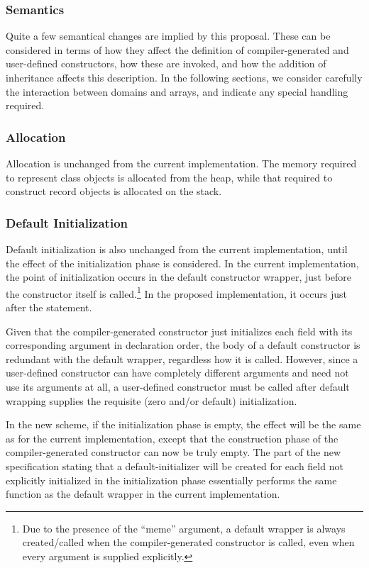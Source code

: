\subsubsection{Semantics}

Quite a few semantical changes are implied by this proposal.  These can be
considered in terms of how they affect the definition of compiler-generated and
user-defined constructors, how these are invoked, and how the addition of
inheritance affects this description.  In the following sections, we consider carefully the interaction
between domains and arrays, and indicate any special handling required.

\subsubsection{Allocation}

Allocation is unchanged from the current implementation.  The memory
required to represent class objects is allocated from the heap, while that
required to construct record objects is allocated on the stack.  

\subsubsection{Default Initialization} 
Default initialization is also unchanged from the current
implementation, until the effect of the initialization phase is considered.  In
the current implementation, the point of initialization occurs in the default
constructor wrapper, just before the constructor itself is called.\footnote{Due
to the presence of the ``meme'' argument, a default wrapper is always
created/called when the compiler-generated constructor is called, even when
every argument is supplied explicitly.}  In the proposed implementation, it
occurs just after the  statement.

Given that the compiler-generated
constructor just initializes each field with its corresponding argument in
declaration order, the body of a default constructor is redundant with the
default wrapper, regardless how it is called.  However, since a user-defined
constructor can have completely different arguments and need not use its
arguments at all, a user-defined constructor must be called after default
wrapping supplies the requisite (zero and/or default) initialization.

In the new scheme, if the initialization phase is empty, the effect will
be the same as for the current implementation, except that the construction phase of the
compiler-generated constructor can now be truly empty.  The part of the
new specification stating that a default-initializer will be created for each
field not explicitly initialized in the initialization phase essentially
performs the same function as the default wrapper in the current implementation.

